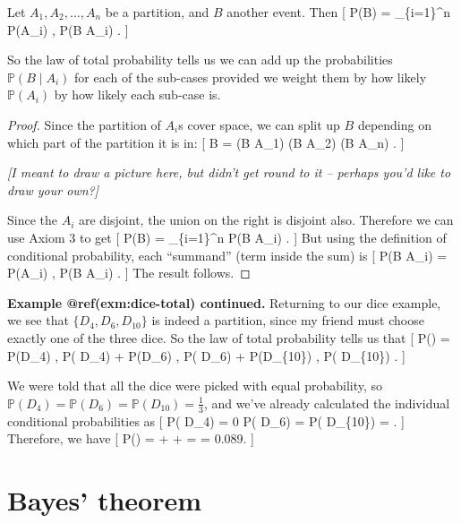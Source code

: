 \documentclass[
  letterpaper,
  DIV=11,
  numbers=noendperiod]{scrreprt}
\theoremstyle{remark}
\begin{document}
\leavevmode{}%
Let \(A_1, A_2, \dots, A_n\) be a partition, and \(B\) another event.
Then {[} \mathbb P(B) = \sum\_\{i=1\}\^{}n \mathbb P(A\_i) , \mathbb P(B
\mid A\_i) . {]}

So the law of total probability tells us we can add up the probabilities
\(\mathbb P(B \mid A_i)\) for each of the sub-cases provided we weight
them by how likely \(\mathbb P(A_i)\) by how likely each sub-case is.

\begin{proof}

Since the partition of \(A_i\)s cover space, we can split up \(B\)
depending on which part of the partition it is in: {[} B = (B \cap A\_1)
\cup (B \cap A\_2) \cup \cdots \cup (B \cap A\_n) . {]}

\emph{{[}I meant to draw a picture here, but didn't get round to it --
perhaps you'd like to draw your own?{]}}

Since the \(A_i\) are disjoint, the union on the right is disjoint also.
Therefore we can use Axiom 3 to get {[} \mathbb P(B) =
\sum\_\{i=1\}\^{}n \mathbb P(B \cap A\_i) . {]} But using the definition
of conditional probability, each ``summand'' (term inside the sum) is
{[} \mathbb P(B \cap A\_i) = \mathbb P(A\_i) , \mathbb P(B \mid A\_i) .
{]} The result follows.

\end{proof}

\textbf{Example @ref(exm:dice-total) continued.} Returning to our dice
example, we see that \(\{D_4, D_6, D_{10}\}\) is indeed a partition,
since my friend must choose exactly one of the three dice. So the law of
total probability tells us that {[} \mathbb P() =
\mathbb P(D\_4) , \mathbb P( \mid D\_4) + \mathbb P(D\_6) ,
\mathbb P( \mid D\_6) + \mathbb P(D\_\{10\}) ,
\mathbb P( \mid D\_\{10\}) . {]}

We were told that all the dice were picked with equal probability, so
\(\mathbb P(D_4) = \mathbb P(D_6) = \mathbb P(D_{10}) = \frac13\), and
we've already calculated the individual conditional probabilities as {[}
\mathbb P( \mid D\_4) = 0 \qquad \mathbb P(
\mid D\_6) =  \qquad \mathbb P( \mid D\_\{10\}) =
 . {]} Therefore, we have {[} \mathbb P() =
 + \times{} + \times{} =
 = 0.089. {]}

\hypertarget{bayes}{%
\section{Bayes' theorem}\label{bayes}}
\end{document}
